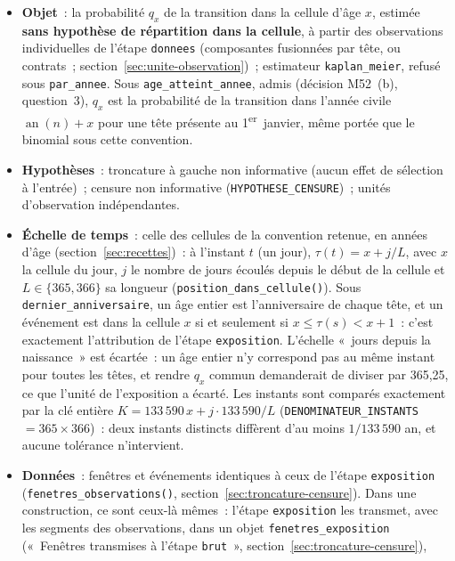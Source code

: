 \documentclass[a4paper,11pt]{article}
\newcommand{\code}[1]{\texttt{\small #1}}
\begin{document}
\begin{itemize}[leftmargin=*, itemsep=2pt]
  \item \textbf{Objet}~: la probabilité $q_x$ de la transition dans la
    cellule d'âge $x$, estimée \textbf{sans hypothèse de répartition dans la
    cellule}, à partir des observations individuelles de l'étape
    \code{donnees} (composantes fusionnées par tête, ou contrats~;
    section~\ref{sec:unite-observation})~; estimateur \code{kaplan\_meier},
    refusé sous \code{par\_annee}. Sous \code{age\_atteint\_annee}, admis
    (décision M52~(b), question~3), $q_x$ est la probabilité de la transition
    dans l'année civile $\operatorname{an}(n) + x$ pour une tête présente au
    1\textsuperscript{er}~janvier, même portée que le binomial sous cette
    convention.
  \item \textbf{Hypothèses}~: troncature à gauche non informative (aucun
    effet de sélection à l'entrée)~; censure non informative
    (\code{HYPOTHESE\_CENSURE})~; unités d'observation indépendantes.
  \item \textbf{Échelle de temps}~: celle des cellules de la convention
    retenue, en années d'âge (section~\ref{sec:recettes})~: à l'instant $t$
    (un jour), $\tau(t) = x + j/L$, avec $x$ la cellule du jour, $j$ le
    nombre de jours écoulés depuis le début de la cellule et $L \in \{365,
    366\}$ sa longueur (\code{position\_dans\_cellule()}). Sous
    \code{dernier\_anniversaire}, un âge entier est l'anniversaire de chaque
    tête, et un événement est dans la cellule $x$ si et seulement si
    $x \le \tau(s) < x + 1$~: c'est exactement l'attribution de l'étape
    \code{exposition}. L'échelle «~jours depuis la naissance~» est écartée~:
    un âge entier n'y correspond pas au même instant pour toutes les têtes,
    et rendre $q_x$ commun demanderait de diviser par 365,25, ce que l'unité
    de l'exposition a écarté. Les instants sont comparés exactement par la
    clé entière $K = 133\,590\,x + j \cdot 133\,590/L$
    (\code{DENOMINATEUR\_INSTANTS} $= 365 \times 366$)~: deux instants
    distincts diffèrent d'au moins $1/133\,590$ an, et aucune tolérance
    n'intervient.
  \item \sloppy \textbf{Données}~: fenêtres et événements identiques à ceux de
    l'étape \code{exposition} (\code{fenetres\_observations()},
    section~\ref{sec:troncature-censure}). Dans une construction, ce sont
    ceux-là mêmes~: l'étape \code{exposition} les transmet, avec les segments
    des observations, dans un objet \code{fenetres\_exposition} («~Fenêtres
    transmises à l'étape \code{brut}~», section~\ref{sec:troncature-censure}),

\end{itemize}
\end{document}
